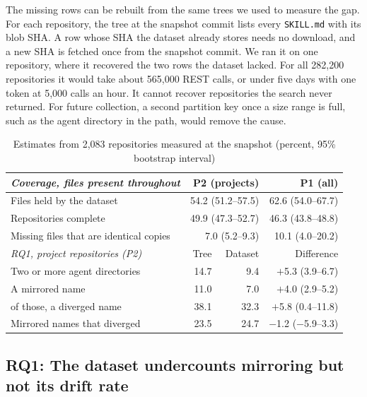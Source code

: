 The missing rows can be rebuilt from the same trees we used to measure the gap. For each repository, the tree at the
snapshot commit lists every \texttt{SKILL.md} with its blob SHA. A row whose SHA the dataset already stores needs no
download, and a new SHA is fetched once from the snapshot commit. We ran it on one repository, where it
recovered the two rows the dataset lacked. For all 282,200 repositories it would take about 565,000 REST calls, or
under five days with one token at 5,000 calls an hour. It cannot recover repositories the search never returned. For
future collection, a second partition key once a size range is full, such as the agent directory in the path, would
remove the cause.

\begin{table}[t]
\centering
\caption{Estimates from 2,083 repositories measured at the snapshot (percent, 95\% bootstrap interval)}
\label{tab:estimates}
\footnotesize
\setlength{\tabcolsep}{2.5pt}
\begin{tabular*}{\columnwidth}{@{\extracolsep{\fill}}lrrr@{}}
\toprule
\textit{Coverage, files present throughout} & \multicolumn{2}{r}{P2 (projects)} & P1 (all) \\
\midrule
Files held by the dataset & \multicolumn{2}{r}{54.2 (51.2--57.5)} & 62.6 (54.0--67.7) \\
Repositories complete & \multicolumn{2}{r}{49.9 (47.3--52.7)} & 46.3 (43.8--48.8) \\
Missing files that are identical copies & \multicolumn{2}{r}{7.0 (5.2--9.3)} & 10.1 (4.0--20.2) \\
\midrule
\textit{RQ1, project repositories (P2)} & Tree & Dataset & Difference \\
\midrule
Two or more agent directories & 14.7 & 9.4 & $+$5.3 (3.9--6.7) \\
A mirrored name & 11.0 & 7.0 & $+$4.0 (2.9--5.2) \\
\quad of those, a diverged name & 38.1 & 32.3 & $+$5.8 (0.4--11.8) \\
Mirrored names that diverged & 23.5 & 24.7 & $-$1.2 ($-$5.9--3.3) \\
\bottomrule
\end{tabular*}
\end{table}

\subsection{RQ1: The dataset undercounts mirroring but not its drift rate}
\label{sec:rq1}

